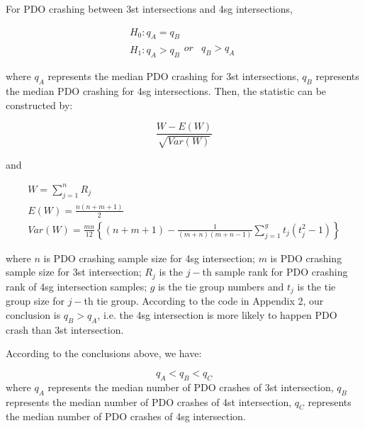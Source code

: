 \documentclass[11pt]{scrartcl} %
\begin{document}
\par

For PDO crashing between 3st intersections and 4sg intersections,

\begin{equation*}
\begin{array}{l}
{H_0}:{q_A} = {q_B}\\
{H_1}:{q_A} > {q_B}\begin{array}{*{20}{c}}
{or}&{{q_B} > {q_A}}
\end{array}
\end{array}
\end{equation*}

where ${q_A}$ represents the median PDO crashing for 3st intersections, $q_B$ represents the median PDO crashing for 4sg intersections. Then, the statistic can be constructed by:

\begin{equation*}
\frac{{W - E\left( W \right)}}{{\sqrt {Var\left( W \right)} }}
\end{equation*}

and

\begin{equation*}
\begin{array}{l}
W = \sum\limits_{j = 1}^n {{R_j}} \\
E\left( W \right) = \frac{{n\left( {n + m + 1} \right)}}{2}\\
Var\left( W \right) = \frac{{mn}}{{12}}\left\{ {\left( {n + m + 1} \right) - \frac{1}{{\left( {m + n} \right)\left( {m + n - 1} \right)}}\sum\limits_{j = 1}^g {{t_j}\left( {t_j^2 - 1} \right)} } \right\}
\end{array}
\end{equation*}

where $n$ is PDO crashing sample size for 4sg intersection; $m$ is PDO crashing sample size for 3st intersection; $R_j$ is the $j-$th sample rank for PDO crashing rank of 4sg intersection samples; $g$ is the tie group numbers and $t_j$ is the tie group size for $j-$th tie group. According to the code in Appendix 2, our conclusion is ${{q_B} > {q_A}}$, i.e. the 4sg intersection is more likely to happen PDO crash than 3st intersection.

\par

According to the conclusions above, we have:

\begin{equation*}
{q_A} < {q_B} < {q_C}
\end{equation*}
where $q_A$ represents the median number of PDO crashes of 3st intersection, $q_B$ represents the median number of PDO crashes of 4st intersection, $q_C$ represents the median number of PDO crashes of 4sg intersection.
\end{document}
